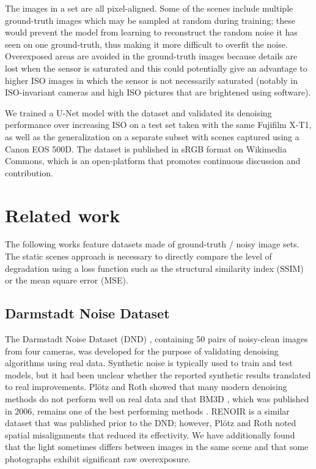 \documentclass[10pt,twocolumn,letterpaper]{article}
\begin{document}
The images in a set are all pixel-aligned. Some of the scenes include multiple ground-truth images which may be sampled at random during training; these would prevent the model from learning to reconstruct the random noise it has seen on one ground-truth, thus making it more difficult to overfit the noise. Overexposed areas are avoided in the ground-truth images because details are lost when the sensor is saturated and this could potentially give an advantage to higher ISO images in which the sensor is not necessarily saturated (notably in ISO-invariant cameras and high ISO pictures that are brightened using software).


We trained a U-Net model with the dataset and validated its denoising performance over increasing ISO on a test set taken with the same Fujifilm X-T1, as well as the generalization on a separate subset with scenes captured using a Canon EOS 500D. The dataset is published in sRGB format on Wikimedia Commons, which is an open-platform that promotes continuous discussion and contribution.
\section{Related work}
The following works feature datasets made of ground-truth / noisy image sets. The static scenes approach is necessary to directly compare the level of degradation using a loss function such as the structural similarity index (SSIM) \cite{ssim} or the mean square error (MSE). 
\subsection{Darmstadt Noise Dataset}
The Darmstadt Noise Dataset (DND) \cite{darmstadt}, containing 50 pairs of noisy-clean images from four cameras, was developed for the purpose of validating denoising algorithms using real data. Synthetic noise is typically used to train and test models, but it had been unclear whether the reported synthetic results translated to real improvements. Plötz and Roth showed that many modern denoising methods do not perform well on real data and that BM3D \cite{bm3d}, which was published in 2006, remains one of the best performing methods \cite{darmstadt}. RENOIR \cite{renoir} is a similar dataset that was published prior to the DND; however, Plötz and Roth noted spatial misalignments that reduced its effectivity. We have additionally found that the light sometimes differs between images in the same scene and that some photographs exhibit significant raw overexposure.
\end{document}
